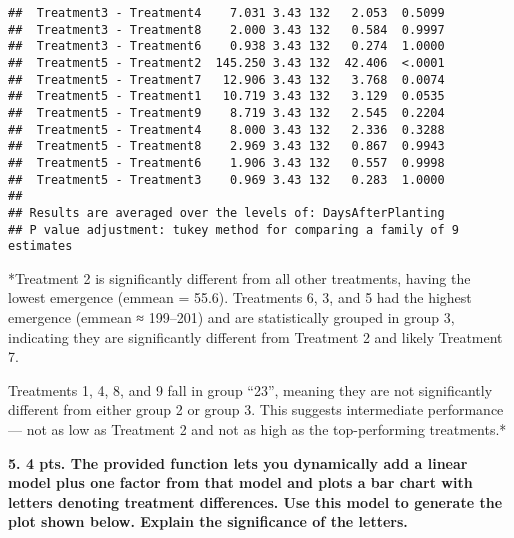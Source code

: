 \documentclass[
]{article}
\begin{document}
\begin{verbatim}
##  Treatment3 - Treatment4    7.031 3.43 132   2.053  0.5099
##  Treatment3 - Treatment8    2.000 3.43 132   0.584  0.9997
##  Treatment3 - Treatment6    0.938 3.43 132   0.274  1.0000
##  Treatment5 - Treatment2  145.250 3.43 132  42.406  <.0001
##  Treatment5 - Treatment7   12.906 3.43 132   3.768  0.0074
##  Treatment5 - Treatment1   10.719 3.43 132   3.129  0.0535
##  Treatment5 - Treatment9    8.719 3.43 132   2.545  0.2204
##  Treatment5 - Treatment4    8.000 3.43 132   2.336  0.3288
##  Treatment5 - Treatment8    2.969 3.43 132   0.867  0.9943
##  Treatment5 - Treatment6    1.906 3.43 132   0.557  0.9998
##  Treatment5 - Treatment3    0.969 3.43 132   0.283  1.0000
## 
## Results are averaged over the levels of: DaysAfterPlanting 
## P value adjustment: tukey method for comparing a family of 9 estimates
\end{verbatim}

*Treatment 2 is significantly different from all other treatments,
having the lowest emergence (emmean = 55.6). Treatments 6, 3, and 5 had
the highest emergence (emmean ≈ 199--201) and are statistically grouped
in group 3, indicating they are significantly different from Treatment 2
and likely Treatment 7.

Treatments 1, 4, 8, and 9 fall in group ``23'', meaning they are not
significantly different from either group 2 or group 3. This suggests
intermediate performance --- not as low as Treatment 2 and not as high
as the top-performing treatments.*

\textbf{5. 4 pts. The provided function lets you dynamically add a
linear model plus one factor from that model and plots a bar chart with
letters denoting treatment differences. Use this model to generate the
plot shown below. Explain the significance of the letters. }
\end{document}
